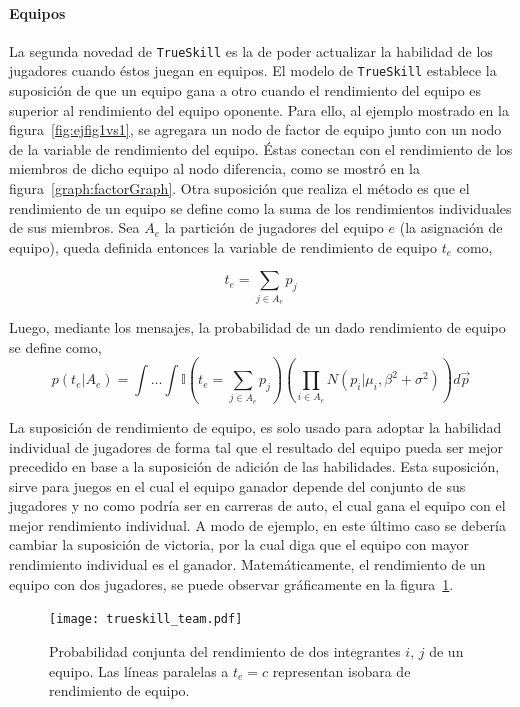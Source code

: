 \documentclass[11pt,twoside,spanish]{report} %
\begin{document}
\paragraph{Equipos}

La segunda novedad de \texttt{TrueSkill} es la de poder actualizar la habilidad de los jugadores cuando \'estos juegan en equipos.
El modelo de \texttt{TrueSkill} establece la suposici\'on de que un equipo gana a otro cuando el rendimiento del equipo es superior al rendimiento del equipo oponente.
Para ello, al ejemplo mostrado en la figura~\ref{fig:ejfig1vs1}, se agregara un nodo de factor de equipo junto con un nodo de la variable de rendimiento del equipo.
\'Estas conectan con el rendimiento de los miembros de dicho equipo al nodo diferencia, como se mostr\'o en la figura~\ref{graph:factorGraph}.
Otra suposici\'on que realiza el m\'etodo es que el rendimiento de un equipo se define como la suma de los rendimientos individuales de sus miembros.
Sea $A_e$ la partici\'on de jugadores del equipo $e$ (la asignaci\'on de equipo), queda definida entonces la variable de rendimiento de equipo $t_e$ como,

\begin{equation}
t_e = \sum_{j\in A_e } p_j
\end{equation}

Luego, mediante los mensajes, la probabilidad de un dado rendimiento de equipo se define como,
\begin{equation}
p(t_e|A_e) = \int \dots \int \mathbb{I}(t_e = \sum_{j\in A_e } p_j ) \left(\prod_{i \in A_e} N(p_i|\mu_i,\beta^2 + \sigma^2) \right) d\vec{p}
\end{equation}

La suposici\'on de rendimiento de equipo, es solo usado para adoptar la habilidad individual de jugadores de forma tal que el resultado del equipo pueda ser mejor precedido en base a la suposici\'on de adici\'on de las habilidades.
Esta suposici\'on, sirve para juegos en el cual el equipo ganador depende del conjunto de sus jugadores y no como podr\'ia ser en carreras de auto, el cual gana el equipo con el mejor rendimiento individual.
A modo de ejemplo, en este \'ultimo caso se deber\'ia cambiar la suposici\'on de victoria, por la cual diga que el equipo con mayor rendimiento individual es el ganador.
Matem\'aticamente, el rendimiento de un equipo con dos jugadores, se puede observar gr\'aficamente en la figura~\ref{fig:fig9}.

\begin{figure}[H]
	\centering
	\texttt{[image: trueskill\_team.pdf]}
	\caption{Probabilidad conjunta del rendimiento de dos integrantes $i$, $j$ de un equipo. Las l\'ineas paralelas a $t_e=c$ representan isobara de rendimiento de equipo.}
	\label{fig:fig9}
\end{figure}
\end{document}
